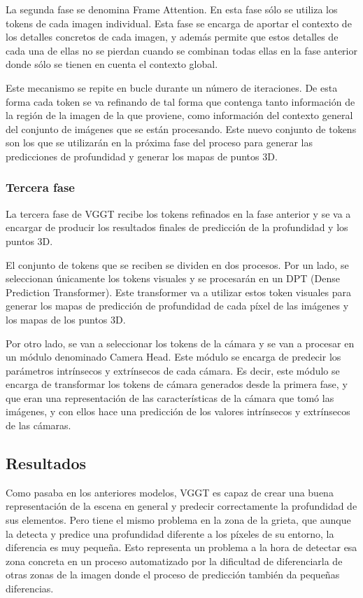 La segunda fase se denomina Frame Attention. En esta fase sólo se utiliza los tokens de cada imagen individual. Esta fase se encarga de aportar el contexto de los detalles concretos de cada imagen, y además permite que estos detalles de cada una de ellas no se pierdan cuando se combinan todas ellas en la fase anterior donde sólo se tienen en cuenta el contexto global.

Este mecanismo se repite en bucle durante un número de iteraciones. De esta forma cada token se va refinando de tal forma que contenga tanto información de la región de la imagen de la que proviene, como información del contexto general del conjunto de imágenes que se están procesando. Este nuevo conjunto de tokens son los que se utilizarán en la próxima fase del proceso para generar las predicciones de profundidad y generar los mapas de puntos 3D.

\subsubsection{Tercera fase}
La tercera fase de VGGT recibe los tokens refinados en la fase anterior y se va a encargar de producir los resultados finales de predicción de la profundidad y los puntos 3D.

El conjunto de tokens que se reciben se dividen en dos procesos. Por un lado, se seleccionan únicamente los tokens visuales y se procesarán en un DPT (Dense Prediction Transformer). Este transformer va a utilizar estos token visuales para generar los mapas de predicción de profundidad de cada píxel de las imágenes y los mapas de los puntos 3D. 

Por otro lado, se van a seleccionar los tokens de la cámara y se van a procesar en un módulo denominado Camera Head. Este módulo se encarga de predecir los parámetros intrínsecos y extrínsecos de cada cámara. Es decir, este módulo se encarga de transformar los tokens de cámara generados desde la primera fase, y que eran una representación de las características de la cámara que tomó las imágenes, y con ellos hace una predicción de los valores intrínsecos y extrínsecos de las cámaras.

\subsection{Resultados}
Como pasaba en los anteriores modelos, VGGT es capaz de crear una buena representación de la escena en general y predecir correctamente la profundidad de sus elementos. Pero tiene el mismo problema en la zona de la grieta, que aunque la detecta y predice una profundidad diferente a los píxeles de su entorno, la diferencia es muy pequeña. Esto representa un problema a la hora de detectar esa zona concreta en un proceso automatizado por la dificultad de diferenciarla de otras zonas de la imagen donde el proceso de predicción también da pequeñas diferencias.

